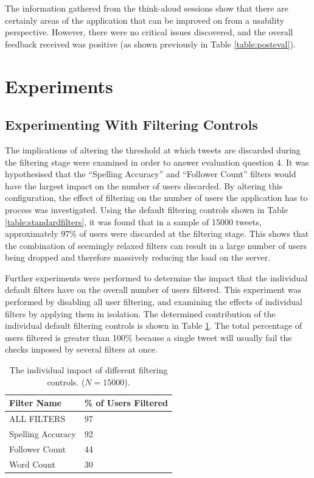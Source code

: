 \documentclass{l4proj}
\begin{document}
The information gathered from the think-aloud sessions show that there are certainly areas of the application that can be improved on from a usability perspective. However, there were no critical issues discovered, and the overall feedback received was positive (as shown previously in Table \ref{table:posteval}).

\section{Experiments}
    
    \subsection{Experimenting With Filtering Controls}
    The implications of altering the threshold at which tweets are discarded during the filtering stage were examined in order to answer evaluation question 4. It was hypothesised that the ``Spelling Accuracy'' and ``Follower Count'' filters would have the largest impact on the number of users discarded. By altering this configuration, the effect of filtering on the number of users the application has to process was investigated. Using the default filtering controls shown in Table \ref{table:standardfilters}, it was found that in a sample of 15000 tweets, approximately $97\%$ of users were discarded at the filtering stage. This shows that the combination of seemingly relaxed filters can result in a large number of users being dropped and therefore massively reducing the load on the server. 
    
Further experiments were performed to determine the impact that the individual default filters have on the overall number of users filtered. This experiment was performed by disabling all user filtering, and examining the effects of individual filters by applying them in isolation. The determined contribution of the individual default filtering controls is shown in Table \ref{table:filteringresults}. The total percentage of users filtered is greater than 100\% because a single tweet will usually fail the checks imposed by several filters at once.

\begin{table}[H]
    \centering
    \begin{tabular}{| l | l |}
    \hline
    Filter Name & \% of Users Filtered \\ \hline
    ALL FILTERS & 97 \\ \hline
    Spelling Accuracy & 92  \\ \hline
    Follower Count & 44 \\ \hline
    Word Count & 30 \\
    \hline
    \end{tabular}
    \caption{\label{table:filteringresults}The individual impact of different filtering controls. ($N=15000$).}
\end{table}
\end{document}

